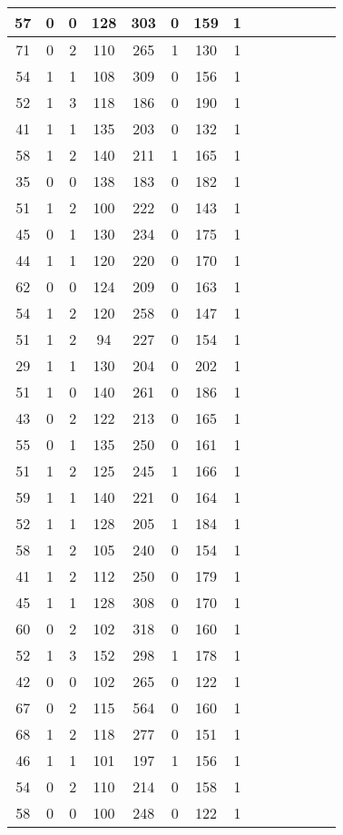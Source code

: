 \documentclass{article}
\begin{document}
\begin{longtable}{|c|c|c|c|c|c|c|c|c|c|c|c|c|c|}
\hline
57 & 0 & 0 & 128 & 303 & 0 & 159 & 1\\
\hline
71 & 0 & 2 & 110 & 265 & 1 & 130 & 1\\
\hline
54 & 1 & 1 & 108 & 309 & 0 & 156 & 1\\
\hline
52 & 1 & 3 & 118 & 186 & 0 & 190 & 1\\
\hline
41 & 1 & 1 & 135 & 203 & 0 & 132 & 1\\
\hline
58 & 1 & 2 & 140 & 211 & 1 & 165 & 1\\
\hline
35 & 0 & 0 & 138 & 183 & 0 & 182 & 1\\
\hline
51 & 1 & 2 & 100 & 222 & 0 & 143 & 1\\
\hline
45 & 0 & 1 & 130 & 234 & 0 & 175 & 1\\
\hline
44 & 1 & 1 & 120 & 220 & 0 & 170 & 1\\
\hline
62 & 0 & 0 & 124 & 209 & 0 & 163 & 1\\
\hline
54 & 1 & 2 & 120 & 258 & 0 & 147 & 1\\
\hline
51 & 1 & 2 & 94 & 227 & 0 & 154 & 1\\
\hline
29 & 1 & 1 & 130 & 204 & 0 & 202 & 1\\
\hline
51 & 1 & 0 & 140 & 261 & 0 & 186 & 1\\
\hline
43 & 0 & 2 & 122 & 213 & 0 & 165 & 1\\
\hline
55 & 0 & 1 & 135 & 250 & 0 & 161 & 1\\
\hline
51 & 1 & 2 & 125 & 245 & 1 & 166 & 1\\
\hline
59 & 1 & 1 & 140 & 221 & 0 & 164 & 1\\
\hline
52 & 1 & 1 & 128 & 205 & 1 & 184 & 1\\
\hline
58 & 1 & 2 & 105 & 240 & 0 & 154 & 1\\
\hline
41 & 1 & 2 & 112 & 250 & 0 & 179 & 1\\
\hline
45 & 1 & 1 & 128 & 308 & 0 & 170 & 1\\
\hline
60 & 0 & 2 & 102 & 318 & 0 & 160 & 1\\
\hline
52 & 1 & 3 & 152 & 298 & 1 & 178 & 1\\
\hline
42 & 0 & 0 & 102 & 265 & 0 & 122 & 1\\
\hline
67 & 0 & 2 & 115 & 564 & 0 & 160 & 1\\
\hline
68 & 1 & 2 & 118 & 277 & 0 & 151 & 1\\
\hline
46 & 1 & 1 & 101 & 197 & 1 & 156 & 1\\
\hline
54 & 0 & 2 & 110 & 214 & 0 & 158 & 1\\
\hline
58 & 0 & 0 & 100 & 248 & 0 & 122 & 1\\

\end{longtable}
\end{document}
